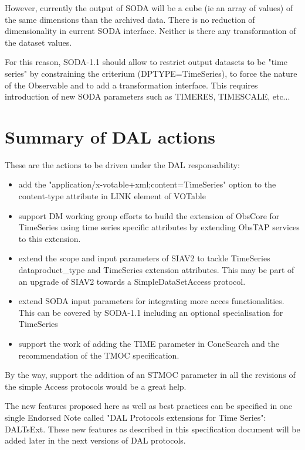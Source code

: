 \documentclass[11pt,a4paper]{ivoa}
\begin{document}
 However, currently the output of SODA will be a cube (ie an array of values) of the same dimensions than the archived data. There is no reduction of dimensionality in current SODA interface. Neither is there any transformation of the dataset values.  
 
    For this reason, SODA-1.1 should allow to restrict output datasets to be  "time series" by constraining the criterium (DPTYPE=TimeSeries), to force the nature of the  Observable and to add a transformation interface.  This requires introduction of new SODA parameters such as TIMERES, TIMESCALE,  etc...


  

\section{Summary of DAL actions}
These are the actions to be driven under the DAL responsability:

\begin{itemize}
\item add the "application/x-votable+xml;content=TimeSeries" option to the content-type attribute in LINK element of VOTable
\item support DM working group efforts to build the extension of ObsCore for TimeSeries  using time series specific attributes by extending ObsTAP services to this extension.
\item extend the scope and input parameters of SIAV2 to tackle TimeSeries dataproduct\_type and TimeSeries extension attributes. This may be part of an upgrade of SIAV2 towards a SimpleDataSetAccess protocol.
\item extend SODA input parameters for integrating more acces functionalities. This can be covered by SODA-1.1 including  an optional specialisation for TimeSeries 
\item support the work of adding the TIME parameter in ConeSearch and the recommendation of the TMOC specification.

\end{itemize}
 By the way, support the addition of an STMOC parameter in all the revisions of the simple Access protocols would be a great help.
  
 

The new features proposed here as well as best practices  can be specified in one single   Endorsed Note called "DAL Protocols extensions for Time Series": DALTsExt. These new features as described in this specification document will be added later in the next versions of DAL protocols.   
\end{document}
